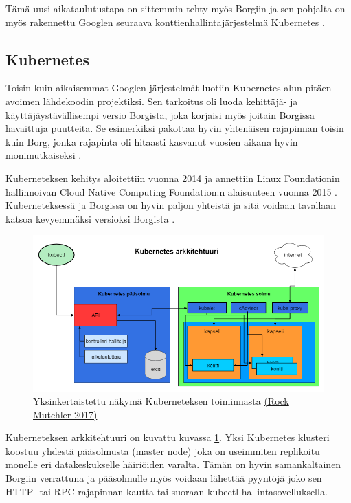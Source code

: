\documentclass[finnish]{tktltiki2}
\theoremstyle{definition}
\theoremstyle{remark}
\begin{document}
Tämä uusi aikataulutustapa on sittemmin tehty myös Borgiin ja sen pohjalta on myös rakennettu Googlen seuraava konttienhallintajärjestelmä Kubernetes \cite{omega}.

\subsection{Kubernetes}

Toisin kuin aikaisemmat Googlen järjestelmät luotiin Kubernetes alun pitäen avoimen lähdekoodin projektiksi. Sen tarkoitus oli luoda kehittäjä- ja käyttäjäystävällisempi versio Borgista, joka korjaisi myös joitain Borgissa havaittuja puutteita. Se esimerkiksi pakottaa hyvin yhtenäisen rajapinnan toisin kuin Borg, jonka rajapinta oli hitaasti kasvanut vuosien aikana hyvin monimutkaiseksi \cite{borg-omega-kubernetes}.

Kuberneteksen kehitys aloitettiin vuonna 2014 ja annettiin Linux Foundationin hallinnoivan Cloud Native Computing Foundation:n alaisuuteen vuonna 2015 \cite{tc-kubernetes-cncf}. Kuberneteksessä ja Borgissa on hyvin paljon yhteistä ja sitä voidaan tavallaan katsoa kevyemmäksi versioksi Borgista \cite{borg-goto-youtube}.

\begin{figure}[h]
    \centering
    \includegraphics[width=1\textwidth]{images/kubernetes-2.png}
    \caption{Yksinkertaistettu näkymä Kuberneteksen toiminnasta \href{https://www.youtube.com/watch?v=YKg7uNMy_rc}{(Rock Mutchler 2017)}}
    \label{fig:kubernetes}
\end{figure}

Kuberneteksen arkkitehtuuri on kuvattu kuvassa \ref{fig:kubernetes}. Yksi Kubernetes klusteri koostuu yhdestä pääsolmusta (master node) joka on useimmiten replikoitu monelle eri datakeskukselle häiriöiden varalta. Tämän on hyvin samankaltainen Borgiin verrattuna ja pääsolmulle myös voidaan lähettää pyyntöjä joko sen HTTP- tai RPC-rajapinnan kautta tai suoraan kubectl-hallintasovelluksella.
\end{document}
